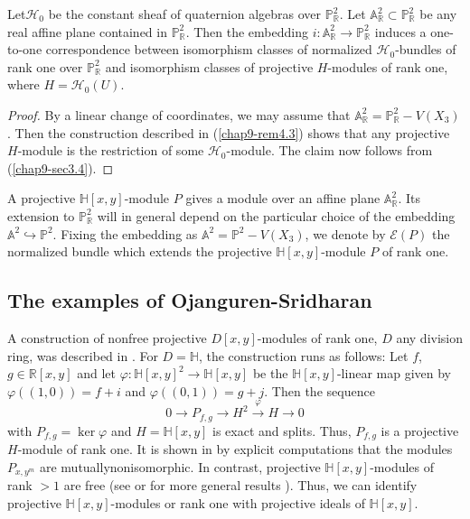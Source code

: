 \setcounter{subprop}{1}
\begin{subthm}\label{chap9-thm4.2}
Let\pageoriginale $\mathscr{H}_{0}$ be the constant sheaf of
quaternion algebras over $\mathbb{P}^{2}_{\mathbb{R}}$. Let
$\mathbb{A}^{2}_{\mathbb{R}}\subset \mathbb{P}^{2}_{\mathbb{R}}$ be
any real affine plane contained in $\mathbb{P}^{2}_{\mathbb{R}}$. Then
the embedding
$i:\mathbb{A}^{2}_{\mathbb{R}}\to \mathbb{P}^{2}_{\mathbb{R}}$ induces
a one-to-one correspondence between isomorphism classes of normalized
$\mathscr{H}_{0}$-bundles of rank one over
$\mathbb{P}^{2}_{\mathbb{R}}$ and isomorphism classes of projective
$H$-modules of rank one, where $H=\mathscr{H}_{0}(U)$.
\end{subthm}

\begin{proof}
By a linear change of coordinates, we may assume that
$\mathbb{A}^{2}_{\mathbb{R}}=\mathbb{P}^{2}_{\mathbb{R}}-V(X_{3})$. Then
the construction described in (\ref{chap9-rem4.3}) shows that any
projective $H$-module is the restriction of some
$\mathscr{H}_{0}$-module. The claim now follows from (\ref{chap9-sec3.4}). 
\end{proof}

\begin{subremark}\label{chap9-rem4.3}
A projective $\mathbb{H}[x,y]$-module $P$ gives a module over an
affine plane $\mathbb{A}^{2}_{\mathbb{R}}$. Its extension to
$\mathbb{P}^{2}_{\mathbb{R}}$ will in general depend on the particular
choice of the embedding
$\mathbb{A}^{2}\hookrightarrow \mathbb{P}^{2}$. Fixing the embedding
as $\mathbb{A}^{2}=\mathbb{P}^{2}-V(X_{3})$, we denote by
$\mathscr{E}(P)$ the normalized bundle which extends the projective
$\mathbb{H}[x,y]$-module $P$ of rank one. 
\end{subremark}

\setcounter{subsection}{3}
\subsection{The examples of Ojanguren-Sridharan}\label{chap9-sec4.4}

A construction of nonfree projective $D[x,y]$-modules of rank one, $D$
any division ring, was described in \cite{chap9-key9}. For
$D=\mathbb{H}$, the construction runs as follows: Let $f$,
$g\in \mathbb{R}[x,y]$ and let
$\varphi:\mathbb{H}[x,y]^{2}\to \mathbb{H}[x,y]$ be the
$\mathbb{H}[x,y]$-linear map given by $\varphi((1,0))=f+i$ and
$\varphi((0,1))=g+j$. Then the sequence 
$$
0\to P_{f,g}\to H^{2}\xrightarrow{\varphi}H\to 0
$$
with $P_{f,g}=\ker \varphi$ and $H=\mathbb{H}[x,y]$ is exact and
splits. Thus, $P_{f,g}$ is a projective $H$-module of rank one. It is
shown in \cite{chap9-key13} by explicit computations that the modules
$P_{x,y^{m}}$ are mutually\pageoriginale nonisomorphic. In contrast,
projective $\mathbb{H}[x,y]$-modules of rank $>1$ are free
(see \cite{chap9-key5} or for more general
results \cite{chap9-key15}). Thus, we can identify projective
$\mathbb{H}[x,y]$-modules or rank one with projective ideals of
$\mathbb{H}[x,y]$. 

